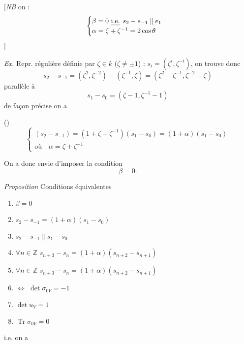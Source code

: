 \documentclass[11pt,a4paper]{article}
\begin{document}
[\emph{NB} on  :
\[
\begin{cases}
\beta = 0 \text{ \uncertain{i.e.} } s_2 - s_{-1} \parallel e_1 \\
\alpha = \zeta + \zeta^{-1} = 2\cos\theta
\end{cases}
\]
]

\emph{Ex.} Repr. régulière définie par $\zeta \in k$ ($\zeta \neq \pm 1$) : $s_i = (\zeta^i, \zeta^{-i})$, on trouve donc
\[
s_2 - s_{-1} = (\zeta^2, \zeta^{-2}) - (\zeta^{-1}, \zeta) = (\zeta^2 - \zeta^{-1}, \zeta^{-2} - \zeta)
\]
parallèle à
\[
s_1 - s_0 = (\zeta - 1, \zeta^{-1} - 1)
\]
de façon précise on a

(\ill{})
\[
\begin{cases}
(s_2 - s_{-1}) = (1 + \zeta + \zeta^{-1})(s_1 - s_0) = (1+\alpha)(s_1 - s_0) \\
\text{où} \quad \alpha = \zeta + \zeta^{-1}
\end{cases}
\]

On a donc envie d'imposer la condition
\[
\beta = 0 .
\]

\emph{Proposition} Conditions équivalentes
\begin{enumerate}
  \item[(i)] $\beta = 0$
  \item[(ii)] $s_2 - s_{-1} = (1+\alpha)(s_1 - s_0)$
  \item[(ii')] $s_2 - s_{-1} \parallel s_1 - s_0$
  \item[(iii)] $\forall n \in \mathbb{Z}$ \quad $s_{n+3} - s_n = (1+\alpha)(s_{n+2} - s_{n+1})$
  \item[(iii')] $\forall n \in \mathbb{Z}$ \quad $s_{n+3} - s_n = (1+\alpha)(s_{n+2} - s_{n+1})$
  \item[(iv)] $\Leftrightarrow$ $\det \sigma_{0V} = -1$
  \item[(iv')] $\det u_V = 1$
  \item[(iv'')] $\operatorname{Tr} \sigma_{0V} = 0$
\end{enumerate}


i.e. on a
\end{document}

